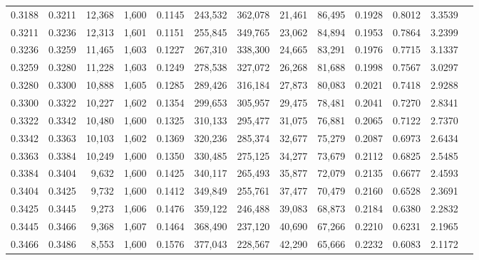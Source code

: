 \begin{tabular}{rrrrrrrrrrrrr}
0.3188 & 0.3211 & 12,368 & 1,600 &                                     0.1145 & 243,532 & 362,078 &  21,461 &  86,495 & 0.1928 & 0.8012 & 3.3539 \\
0.3211 & 0.3236 & 12,313 & 1,601 &                                     0.1151 & 255,845 & 349,765 &  23,062 &  84,894 & 0.1953 & 0.7864 & 3.2399 \\
0.3236 & 0.3259 & 11,465 & 1,603 &                                     0.1227 & 267,310 & 338,300 &  24,665 &  83,291 & 0.1976 & 0.7715 & 3.1337 \\
0.3259 & 0.3280 & 11,228 & 1,603 &                                     0.1249 & 278,538 & 327,072 &  26,268 &  81,688 & 0.1998 & 0.7567 & 3.0297 \\
0.3280 & 0.3300 & 10,888 & 1,605 &                                     0.1285 & 289,426 & 316,184 &  27,873 &  80,083 & 0.2021 & 0.7418 & 2.9288 \\
0.3300 & 0.3322 & 10,227 & 1,602 &                                     0.1354 & 299,653 & 305,957 &  29,475 &  78,481 & 0.2041 & 0.7270 & 2.8341 \\
0.3322 & 0.3342 & 10,480 & 1,600 &                                     0.1325 & 310,133 & 295,477 &  31,075 &  76,881 & 0.2065 & 0.7122 & 2.7370 \\
0.3342 & 0.3363 & 10,103 & 1,602 &                                     0.1369 & 320,236 & 285,374 &  32,677 &  75,279 & 0.2087 & 0.6973 & 2.6434 \\
0.3363 & 0.3384 & 10,249 & 1,600 &                                     0.1350 & 330,485 & 275,125 &  34,277 &  73,679 & 0.2112 & 0.6825 & 2.5485 \\
0.3384 & 0.3404 &  9,632 & 1,600 &                                     0.1425 & 340,117 & 265,493 &  35,877 &  72,079 & 0.2135 & 0.6677 & 2.4593 \\
0.3404 & 0.3425 &  9,732 & 1,600 &                                     0.1412 & 349,849 & 255,761 &  37,477 &  70,479 & 0.2160 & 0.6528 & 2.3691 \\
0.3425 & 0.3445 &  9,273 & 1,606 &                                     0.1476 & 359,122 & 246,488 &  39,083 &  68,873 & 0.2184 & 0.6380 & 2.2832 \\
0.3445 & 0.3466 &  9,368 & 1,607 &                                     0.1464 & 368,490 & 237,120 &  40,690 &  67,266 & 0.2210 & 0.6231 & 2.1965 \\
0.3466 & 0.3486 &  8,553 & 1,600 &                                     0.1576 & 377,043 & 228,567 &  42,290 &  65,666 & 0.2232 & 0.6083 & 2.1172 \\

\end{tabular}
